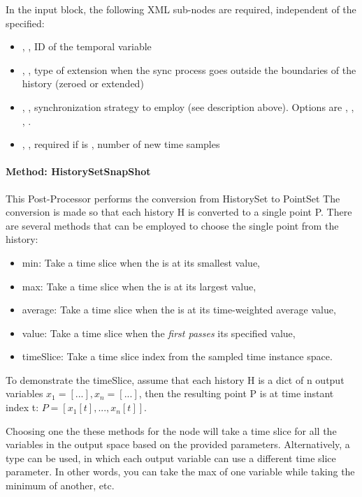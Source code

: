 In the  input block, the following XML sub-nodes are required,
independent of the  specified:

\begin{itemize}
   \item {}, , ID of the temporal variable
   \item {}, , type of extension when the sync process goes outside the boundaries of the history (zeroed or extended)
   \item {}, , synchronization strategy to employ (see
     description above).  Options are , , , .
   \item {}, , required if  is
     , number of new time samples
\end{itemize}

\paragraph{Method: HistorySetSnapShot}
This Post-Processor performs the conversion from HistorySet to PointSet
The conversion is made so that each history H is converted to a single point P.
There are several methods that can be employed to choose the single point from the history:
\begin{itemize}
  \item min: Take a time slice when the  is at its smallest value,
  \item max: Take a time slice when the  is at its largest value,
  \item average: Take a time slice when the  is at its time-weighted average value,
  \item value: Take a time slice when the  \emph{first passes} its specified value,
  \item timeSlice: Take a time slice index from the sampled time instance space.
\end{itemize}
To demonstrate the timeSlice, assume that each history H is a dict of n output variables $x_1=[...],
x_n=[...]$, then the resulting point P is at time instant index t: $P=[x_1[t],...,x_n[t]]$.

Choosing one the these methods for the  node will take a time slice for all the variables in the
output space based on the provided parameters.  Alternatively, a  type can be used, in which
each output variable can use a different time slice parameter.  In other words, you can take the max of one
variable while taking the minimum of another, etc.

